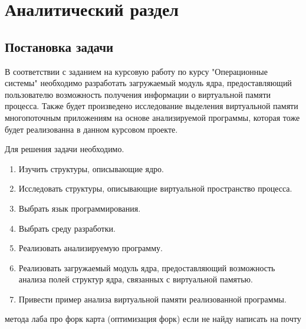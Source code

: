 
\chapter{Аналитический раздел}
\label{cha:analysis}

\section{Постановка задачи}

В соответствии с заданием на курсовую работу по курсу "Операционные системы" 
необходимо разработать загружаемый модуль ядра, предоставляющий пользователю 
возможность получения информации о виртуальной памяти процесса.
Также будет произведено исследование выделения виртуальной памяти
многопоточным приложениям на основе анализируемой программы, которая тоже будет реализованна
в данном курсовом проекте.%

Для решения задачи необходимо.

\begin{enumerate}
	\item Изучить структуры, описывающие ядро.
	\item Исследовать структуры, описывающие виртуальной пространство процесса.
	\item Выбрать язык программирования.
	\item Выбрать среду разработки.
	\item Реализовать анализируемую программу.
	\item Реализовать загружаемый модуль ядра, предоставляющий возможность анализа полей структур ядра, связанных с виртуальной памятью.
	\item Привести пример анализа виртуальной памяти реализованной программы.   
\end{enumerate}

метода лаба про форк карта (оптимизация форк) если не найду написать на почту 



